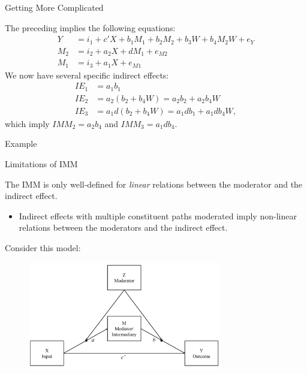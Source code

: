 \documentclass{beamer}
\newcommand{\vb}[0]{\vspace{6pt}}
\begin{document}
\begin{frame}{Getting More Complicated}
  
  The preceding implies the following equations:
  \begin{align}
    Y &= i_1 + c'X + b_1M_1 + b_2M_2 + b_3W + b_4M_2W + e_Y \label{eq3}\\
    M_2 &= i_2 + a_2X + dM_1 + e_{M2}\\
    M_1 &= i_3 + a_1X + e_{M1}
  \end{align}
  We now have several specific indirect effects:
  \begin{align*}
    IE_1 &= a_1b_1\\
    IE_2 &= a_2 \left(b_2 + b_4W \right) = a_2b_2 + a_2b_4W\\
    IE_3 &= a_1 d \left(b_2 + b_4W \right) = a_1db_1 + a_1db_4W,
  \end{align*}
  which imply $IMM_2 = a_2b_4$ and $IMM_3 = a_1db_4$.
  
\end{frame}


  
\begin{frame}[allowframebreaks]{Example}
  


\pagebreak



\end{frame}



\begin{frame}{Limitations of IMM}
  
  The IMM is only well-defined for \emph{linear} relations between the
  moderator and the indirect effect.
  \vb
  \begin{itemize}
  \item Indirect effects with multiple constituent paths moderated
    imply non-linear relations between the moderators and the indirect
    effect.
  \end{itemize}
  \vb
  Consider this model:
  \begin{figure}
    \includegraphics[width = 0.75\textwidth]{figures/modABwithZConceptual.pdf}
  \end{figure}
  
\end{frame}
\end{document}
